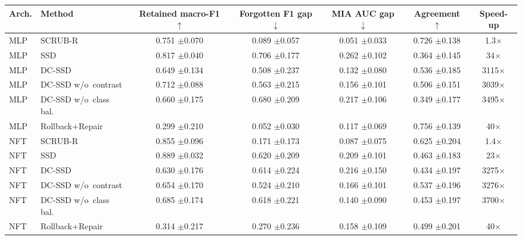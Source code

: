 \begin{tabular}{llccccc}
\toprule
Arch. & Method & Retained macro-F1 $\uparrow$ & Forgotten F1 gap $\downarrow$ &
MIA AUC gap $\downarrow$ & Agreement $\uparrow$ & Speed-up \\
\midrule
MLP & SCRUB-R & 0.751 {\scriptsize$\pm$0.070} & 0.089 {\scriptsize$\pm$0.057} & 0.051 {\scriptsize$\pm$0.033} & 0.726 {\scriptsize$\pm$0.138} & 1.3$\times$ \\
MLP & SSD & 0.817 {\scriptsize$\pm$0.040} & 0.706 {\scriptsize$\pm$0.177} & 0.262 {\scriptsize$\pm$0.102} & 0.364 {\scriptsize$\pm$0.145} & 34$\times$ \\
MLP & DC-SSD & 0.649 {\scriptsize$\pm$0.134} & 0.508 {\scriptsize$\pm$0.237} & 0.132 {\scriptsize$\pm$0.080} & 0.536 {\scriptsize$\pm$0.185} & 3115$\times$ \\
MLP & DC-SSD w/o~contrast & 0.712 {\scriptsize$\pm$0.088} & 0.563 {\scriptsize$\pm$0.215} & 0.156 {\scriptsize$\pm$0.101} & 0.506 {\scriptsize$\pm$0.151} & 3039$\times$ \\
MLP & DC-SSD w/o~class bal. & 0.660 {\scriptsize$\pm$0.175} & 0.680 {\scriptsize$\pm$0.209} & 0.217 {\scriptsize$\pm$0.106} & 0.349 {\scriptsize$\pm$0.177} & 3495$\times$ \\
MLP & Rollback+Repair & 0.299 {\scriptsize$\pm$0.210} & 0.052 {\scriptsize$\pm$0.030} & 0.117 {\scriptsize$\pm$0.069} & 0.756 {\scriptsize$\pm$0.139} & 40$\times$ \\
NFT & SCRUB-R & 0.855 {\scriptsize$\pm$0.096} & 0.171 {\scriptsize$\pm$0.173} & 0.087 {\scriptsize$\pm$0.075} & 0.625 {\scriptsize$\pm$0.204} & 1.4$\times$ \\
NFT & SSD & 0.889 {\scriptsize$\pm$0.032} & 0.620 {\scriptsize$\pm$0.209} & 0.209 {\scriptsize$\pm$0.101} & 0.463 {\scriptsize$\pm$0.183} & 23$\times$ \\
NFT & DC-SSD & 0.630 {\scriptsize$\pm$0.176} & 0.614 {\scriptsize$\pm$0.224} & 0.216 {\scriptsize$\pm$0.150} & 0.434 {\scriptsize$\pm$0.197} & 3275$\times$ \\
NFT & DC-SSD w/o~contrast & 0.654 {\scriptsize$\pm$0.170} & 0.524 {\scriptsize$\pm$0.210} & 0.166 {\scriptsize$\pm$0.101} & 0.537 {\scriptsize$\pm$0.196} & 3276$\times$ \\
NFT & DC-SSD w/o~class bal. & 0.685 {\scriptsize$\pm$0.174} & 0.618 {\scriptsize$\pm$0.221} & 0.140 {\scriptsize$\pm$0.090} & 0.453 {\scriptsize$\pm$0.197} & 3700$\times$ \\
NFT & Rollback+Repair & 0.314 {\scriptsize$\pm$0.217} & 0.270 {\scriptsize$\pm$0.236} & 0.158 {\scriptsize$\pm$0.109} & 0.499 {\scriptsize$\pm$0.201} & 40$\times$ \\
\bottomrule
\end{tabular}
